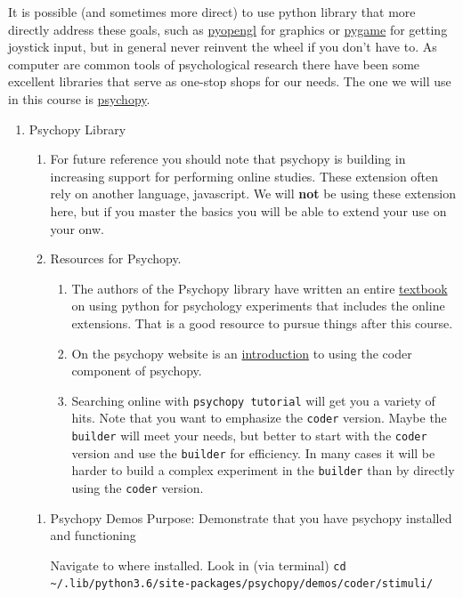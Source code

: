 \documentclass{article}
\begin{document}
It is possible (and sometimes more direct) to use python library that more directly address these goals, such as \href{http://pyopengl.sourceforge.net/}{pyopengl} for graphics or \href{https://www.pygame.org/news}{pygame} for getting joystick input, but in general never reinvent the wheel if you don't have to. As computer are common tools of psychological research there have been some excellent libraries that serve as one-stop shops for our needs. The one we will use in this course is \href{https://www.psychopy.org/}{psychopy}.
\begin{enumerate}
\item Psychopy Library
\label{sec:orge8d1eb8}
\begin{enumerate}
\item For future reference you should note that psychopy is building in increasing support for performing online studies. These extension often rely on another language, javascript. We will \textbf{not} be using these extension here, but if you master the basics you will be able to extend your use on your onw.
\item Resources for Psychopy.
\begin{enumerate}
\item The authors of the Psychopy library have written an entire \href{https://us.sagepub.com/en-us/nam/building-experiments-in-psychopy/book253480\#contents}{textbook} on using python for psychology experiments that includes the online extensions. That is a good resource to pursue things after this course.
\item On the psychopy website is an \href{https://www.psychopy.org/coder/coder.html}{introduction} to using the coder component of psychopy.
\item Searching online with \texttt{psychopy tutorial} will get you a variety of hits. Note that you want to emphasize the \texttt{coder} version. Maybe the \texttt{builder} will meet your needs, but better to start with the \texttt{coder} version and use the \texttt{builder} for efficiency. In many cases it will be harder to build a complex experiment in the \texttt{builder} than by directly using the \texttt{coder} version.
\end{enumerate}
\end{enumerate}
\begin{enumerate}
\item Psychopy Demos
\label{sec:orgb583898}
Purpose: Demonstrate that you have psychopy installed and functioning

Navigate to where installed. Look in (via terminal) \texttt{cd \textasciitilde{}/.lib/python3.6/site-packages/psychopy/demos/coder/stimuli/}


\end{enumerate}
\end{enumerate}
\end{document}
